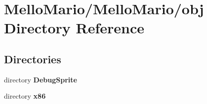 \section{Mello\+Mario/\+Mello\+Mario/obj Directory Reference}
\label{dir_754421ea60f426dfc9393ee99219e608}
\subsection*{Directories}
\begin{DoxyCompactItemize}
\item 
directory \textbf{ Debug\+Sprite}
\item 
directory \textbf{ x86}
\end{DoxyCompactItemize}
